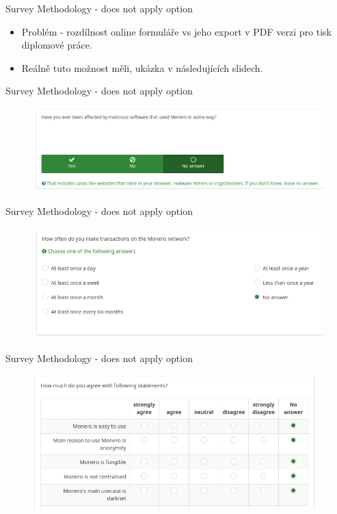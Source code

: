 \documentclass{beamer}
\begin{document}
\begin{darkframes}
\begin{frame}{Survey Methodology - does not apply option}
\begin{itemize}
\item Problém - rozdílnost online formuláře vs jeho export v PDF verzi pro tisk diplomové práce.
\item Reálně tuto možnost měli, ukázka v následujících slidech.
\end{itemize}
    \end{frame}
        \begin{frame}{Survey Methodology - does not apply option}
     	\begin{figure}
  \centering
  \includegraphics[width=1\textwidth]{survey-answer.png}
\end{figure}
    \end{frame}
            \begin{frame}{Survey Methodology - does not apply option}
     	\begin{figure}
  \centering
  \includegraphics[width=1\textwidth]{survey-answernext.png}
\end{figure}
    \end{frame}
            \begin{frame}{Survey Methodology - does not apply option}
     	\begin{figure}
  \centering
  \includegraphics[width=1\textwidth]{survey-answernextanother.png}
\end{figure}
    \end{frame}
    

\end{darkframes}
\end{document}
